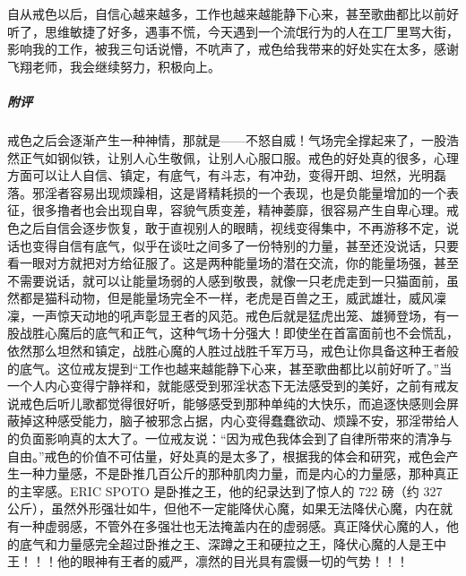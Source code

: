 \begin{case}
    自从戒色以后，自信心越来越多，工作也越来越能静下心来，甚至歌曲都比以前好听了，思维敏捷了好多，遇事不慌，今天遇到一个流氓行为的人在工厂里骂大街，影响我的工作，被我三句话说懵，不吭声了，戒色给我带来的好处实在太多，感谢飞翔老师，我会继续努力，积极向上。
    \subparagraph{附评} 戒色之后会逐渐产生一种神情，那就是——不怒自威！气场完全撑起来了，一股浩然正气如钢似铁，让别人心生敬佩，让别人心服口服。戒色的好处真的很多，心理方面可以让人自信、镇定，有底气，有斗志，有冲劲，变得开朗、坦然，光明磊落。邪淫者容易出现烦躁相，这是肾精耗损的一个表现，也是负能量增加的一个表征，很多撸者也会出现自卑，容貌气质变差，精神萎靡，很容易产生自卑心理。戒色之后自信会逐步恢复，敢于直视别人的眼睛，视线变得集中，不再游移不定，说话也变得自信有底气，似乎在谈吐之间多了一份特别的力量，甚至还没说话，只要看一眼对方就把对方给征服了。这是两种能量场的潜在交流，你的能量场强，甚至不需要说话，就可以让能量场弱的人感到敬畏，就像一只老虎走到一只猫面前，虽然都是猫科动物，但是能量场完全不一样，老虎是百兽之王，威武雄壮，威风凜凜，一声惊天动地的吼声彰显王者的风范。戒色后就是猛虎出笼、雄狮登场，有一股战胜心魔后的底气和正气，这种气场十分强大！即使坐在首富面前也不会慌乱，依然那么坦然和镇定，战胜心魔的人胜过战胜千军万马，戒色让你具备这种王者般的底气。这位戒友提到“工作也越来越能静下心来，甚至歌曲都比以前好听了。”当一个人内心变得宁静祥和，就能感受到邪淫状态下无法感受到的美好，之前有戒友说戒色后听儿歌都觉得很好听，能够感受到那种单纯的大快乐，而追逐快感则会屏蔽掉这种感受能力，脑子被邪念占据，内心变得蠢蠢欲动、烦躁不安，邪淫带给人的负面影响真的太大了。一位戒友说：“因为戒色我体会到了自律所带來的清净与自由。”戒色的价值不可估量，好处真的是太多了，根据我的体会和研究，戒色会产生一种力量感，不是卧推几百公斤的那种肌肉力量，而是内心的力量感，那种真正的主宰感。ERIC SPOTO 是卧推之王，他的纪录达到了惊人的 722 磅（约 327 公斤），虽然外形强壮如牛，但他不一定能降伏心魔，如果无法降伏心魔，内在就有一种虚弱感，不管外在多强壮也无法掩盖内在的虚弱感。真正降伏心魔的人，他的底气和力量感完全超过卧推之王、深蹲之王和硬拉之王，降伏心魔的人是王中王！！！他的眼神有王者的威严，凛然的目光具有震慑一切的气势！！！
\end{case}

